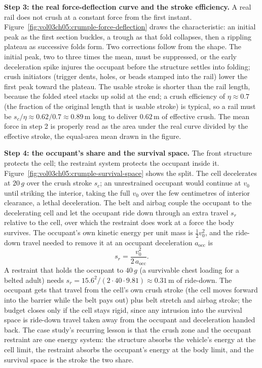 

\textbf{Step 3: the real force-deflection curve and the stroke efficiency.}
A real rail does not crush at a constant force from the first instant.
Figure~\ref{fig:vol03ch05:crumple-force-deflection} draws the
characteristic: an initial peak as the first section buckles, a trough as
that fold collapses, then a rippling plateau as successive folds form. Two
corrections follow from the shape. The initial peak, two to three times the
mean, must be suppressed, or the early deceleration spike injures the
occupant before the structure settles into folding; crush initiators
(trigger dents, holes, or beads stamped into the rail) lower the first peak
toward the plateau. The usable stroke is shorter than the rail length,
because the folded steel stacks up solid at the end; a crush efficiency of
$\eta \approx 0.7$ (the fraction of the original length that is usable
stroke) is typical, so a rail must be $s_c/\eta \approx 0.62/0.7 \approx
0.89\,\si{\meter}$ long to deliver $0.62\,\si{\meter}$ of effective crush.
The mean force in step 2 is properly read as the area under the real curve
divided by the effective stroke, the equal-area mean drawn in the figure.

\textbf{Step 4: the occupant's share and the survival space.} The front
structure protects the cell; the restraint system protects the occupant
inside it. Figure~\ref{fig:vol03ch05:crumple-survival-space} shows the
split. The cell decelerates at $20\,g$ over the crush stroke $s_c$; an
unrestrained occupant would continue at $v_0$ until striking the
interior, taking the full $v_0$ over the few centimetres of interior
clearance, a lethal deceleration. The belt and airbag couple the occupant
to the decelerating cell and let the occupant ride down through an extra
travel $s_r$ relative to the cell, over which the restraint does work at a
force the body survives. The occupant's own kinetic energy per unit mass is
$\tfrac12 v_0^2$, and the ride-down travel needed to remove it at an
occupant deceleration $a_\text{occ}$ is
\[
s_r = \frac{v_0^2}{2\,a_\text{occ}}.
\]
A restraint that holds the occupant to $40\,g$ (a survivable chest
loading for a belted adult) needs $s_r = 15.6^2/(2\cdot 40\cdot 9.81)
\approx 0.31\,\si{\meter}$ of ride-down. The occupant gets that travel from
the cell's own crush stroke (the cell moves forward into the barrier while
the belt pays out) plus belt stretch and airbag stroke; the budget closes
only if the cell stays rigid, since any intrusion into the survival space is
ride-down travel taken away from the occupant and deceleration handed back.
The case study's recurring lesson is that the crush zone and the occupant
restraint are one energy system: the structure absorbs the vehicle's
energy at the cell limit, the restraint absorbs the occupant's energy at
the body limit, and the survival space is the stroke the two share.

